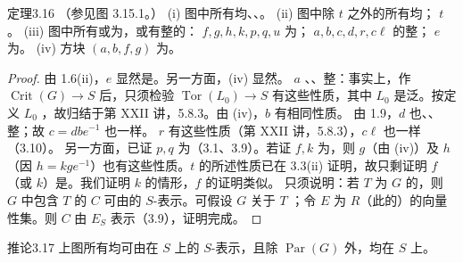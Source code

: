 \begin{SGAresult}{定理}{3.16}
（参见图 3.15.1。）
(i) 图中所有均、、。
(ii) 图中除 $t$ 之外的所有均； $t$ 。
(iii) 图中所有或为，或有整的： $f,g,h,k,p,q,u$ 为； $a,b,c,d,r,c\ell$ 的整； $e$ 为。
(iv) 方块 $(a,b,f,g)$ 为。
\end{SGAresult}
\begin{proof}
由 1.6(ii)，$e$ 显然是。另一方面，(iv) 显然。
 $a$ 、、整：事实上，作 $\operatorname{Crit}(G)\to S$ 后，只须检验 $\operatorname{Tor}(L_0)\to S$ 有这些性质，其中 $L_0$ 是泛。按定义 $L_0$ ，故归结于第 XXII 讲，5.8.3。由 (iv)，$b$ 有相同性质。
由 1.9，$d$ 也、、整；故 $c=dbe^{-1}$ 也一样。 $r$ 有这些性质（第 XXII 讲，5.8.3），$c\ell$ 也一样（3.10）。
另一方面，已证 $p,q$ 为（3.1、3.9）。若证 $f,k$ 为，则 $g$（由 (iv)）及 $h$（因 $h=kge^{-1}$）也有这些性质。$t$ 的所述性质已在 3.3(ii) 证明，故只剩证明 $f$（或 $k$）是。我们证明 $k$ 的情形，$f$ 的证明类似。
只须说明：若 $T$ 为 $G$ 的，则 $G$ 中包含 $T$ 的 $C$ 可由的 $S$-表示。可假设 $G$ 关于 $T$ ；令 $E$ 为 $R$（此的）的向量性集。则 $C$ 由 $E_S$ 表示（3.9），证明完成。
\end{proof}
\begin{SGAresult}{推论}{3.17}
上图所有均可由在 $S$ 上的 $S$-表示，且除 $\operatorname{Par}(G)$ 外，均在 $S$ 上。
\end{SGAresult}
